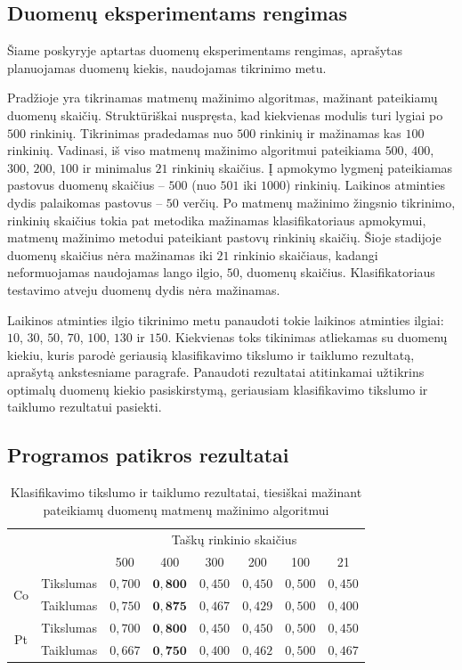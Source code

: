 \documentclass[]{vgtuef}
\begin{document}
\subsection{Duomenų eksperimentams rengimas}

Šiame poskyryje aptartas duomenų eksperimentams rengimas, aprašytas planuojamas duomenų kiekis, naudojamas tikrinimo metu.

Pradžioje yra tikrinamas matmenų mažinimo algoritmas, mažinant pateikiamų duomenų skaičių. Struktūriškai nuspręsta, kad kiekvienas modulis turi lygiai po $500$ rinkinių. Tikrinimas pradedamas nuo $500$ rinkinių ir mažinamas kas $100$ rinkinių. Vadinasi, iš viso matmenų mažinimo algoritmui pateikiama $500$, $400$, $300$, $200$, $100$ ir minimalus $21$ rinkinių skaičius. Į apmokymo lygmenį pateikiamas pastovus duomenų skaičius -- $500$ (nuo $501$ iki $1000$) rinkinių. Laikinos atminties dydis palaikomas pastovus -- $50$ verčių. Po matmenų mažinimo žingsnio tikrinimo, rinkinių skaičius tokia pat metodika mažinamas klasifikatoriaus apmokymui, matmenų mažinimo metodui pateikiant pastovų rinkinių skaičių. Šioje stadijoje duomenų skaičius nėra mažinamas iki $21$ rinkinio skaičiaus, kadangi neformuojamas naudojamas lango ilgio, $50$, duomenų skaičius. Klasifikatoriaus testavimo atveju duomenų dydis nėra mažinamas.

Laikinos atminties ilgio tikrinimo metu panaudoti tokie laikinos atminties ilgiai: $10$, $30$, $50$, $70$, $100$, $130$ ir $150$. Kiekvienas toks tikinimas atliekamas su duomenų kiekiu, kuris parodė geriausią klasifikavimo tikslumo ir taiklumo rezultatą, aprašytą ankstesniame paragrafe. Panaudoti rezultatai atitinkamai užtikrins optimalų duomenų kiekio pasiskirstymą, geriausiam klasifikavimo tikslumo ir taiklumo rezultatui pasiekti.


\subsection{Programos patikros rezultatai}
\begin{table}
	\centering
	\caption{Klasifikavimo tikslumo ir taiklumo rezultatai, tiesiškai mažinant pateikiamų duomenų matmenų mažinimo algoritmui}
	\label{table:first_phase_experiment}
	\begin{tabular}{|c|c|c|c|c|c|c|c|} \hline
			& & \multicolumn{6}{c|}{Taškų rinkinio skaičius} \\ \cline{3-8}
						&	& 500 	& 400	& 300 	& 200 & 100 	& 21 	\\ \hline
		\multirow{2}{*}{Co}
		& Tikslumas	& $0,700$ & $\mathbf{0,800}$ & $0,450$ & $0,450$ & $0,500$ & $0,450$ \\ \cline{2-8}
		& Taiklumas  &	$0,750$ & $\mathbf{0,875}$ & $0,467$ & $0,429$ & $0,500$ & $0,400$ \\ \hline
		\multirow{2}{*}{Pt}
		& Tikslumas	& $0,700$ & $\mathbf{0,800}$ & $0,450$ & $0,450$ & $0,500$ & $0,450$ \\ \cline{2-8}
		& Taiklumas  &	$0,667$ & $\mathbf{0,750}$ & $0,400$ & $0,462$ & $0,500$ & $0,467$ \\ \hline
	\end{tabular}
\end{table}
\end{document}
